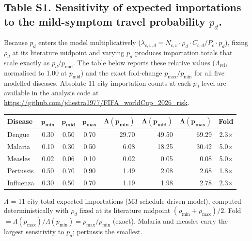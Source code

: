\documentclass[12pt, a4paper]{article}
\begin{document}
\newpage

\subsection*{Table S1. Sensitivity of expected importations to the
mild-symptom travel probability $p_d$.}

Because $p_d$ enters the model multiplicatively
($\lambda_{c,v,d} = N_{c,v}\cdot\rho_d\cdot C_{c,d}/P_c\cdot p_d$),
fixing $\rho_d$ at its literature midpoint and varying $p_d$ produces
importation totals that scale exactly as $p_d/p_{\text{mid}}$. The
table below reports these relative values ($\Lambda_{\text{rel}}$,
normalised to 1.00 at $p_{\text{mid}}$) and the exact fold-change
$p_{\max}/p_{\min}$ for all five modelled diseases. Absolute 11-city
importation counts at each $p_d$ level are available in the
analysis code at \url{https://github.com/jdiestra1977/FIFA\_worldCup\_2026\_risk}.

\medskip
\begin{center}
\small
\begin{tabular}{lcccrrrr}
\toprule
\textbf{Disease} &
  $\boldsymbol{p_{\min}}$ &
  $\boldsymbol{p_{\text{mid}}}$ &
  $\boldsymbol{p_{\max}}$ &
  $\boldsymbol{\Lambda(p_{\min})}$ &
  $\boldsymbol{\Lambda(p_{\text{mid}})}$ &
  $\boldsymbol{\Lambda(p_{\max})}$ &
  \textbf{Fold} \\
\midrule
Dengue    & 0.30 & 0.50 & 0.70 & 29.70 & 49.50 & 69.29 & 2.3$\times$ \\
Malaria   & 0.10 & 0.30 & 0.50 &  6.08 & 18.25 & 30.42 & 5.0$\times$ \\
Measles   & 0.02 & 0.06 & 0.10 &  0.02 &  0.05 &  0.08 & 5.0$\times$ \\
Pertussis & 0.50 & 0.70 & 0.90 &  1.49 &  2.08 &  2.68 & 1.8$\times$ \\
Influenza & 0.30 & 0.50 & 0.70 &  1.19 &  1.98 &  2.78 & 2.3$\times$ \\
\bottomrule
\end{tabular}
\end{center}

\medskip
\noindent
$\Lambda$ = 11-city total expected importations (M3 schedule-driven
model), computed deterministically with $\rho_d$ fixed at its
literature midpoint $({\rho_{\min}+\rho_{\max}})/2$.
Fold $= \Lambda(p_{\max})/\Lambda(p_{\min}) = p_{\max}/p_{\min}$ (exact).
Malaria and measles carry the largest sensitivity to $p_d$; pertussis
the smallest.
\end{document}
